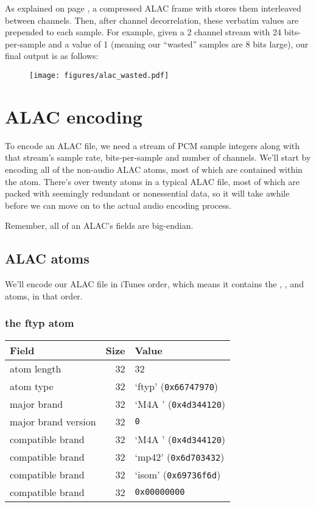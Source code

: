 As explained on page \pageref{alac_wasted_bits}, a compressed ALAC frame
with  stores them interleaved between channels.
Then, after channel decorrelation, these verbatim values are
prepended to each sample.
For example, given a 2 channel stream with 24 bits-per-sample and
a  value of 1 (meaning our ``wasted'' samples
are 8 bits large), our final output is as follows:
\begin{figure}[h]
\texttt{[image: figures/alac\_wasted.pdf]}
\end{figure}

\clearpage

\section{ALAC encoding}

To encode an ALAC file, we need a stream of PCM sample integers
along with that stream's sample rate, bits-per-sample and number of
channels.
We'll start by encoding all of the non-audio ALAC atoms,
most of which are contained within the  atom.
There's over twenty atoms in a typical ALAC file,
most of which are packed with seemingly redundant or
nonessential data,
so it will take awhile before we can move on to the actual
audio encoding process.

Remember, all of an ALAC's fields are big-endian.

\subsection{ALAC atoms}

We'll encode our ALAC file in iTunes order, which means
it contains the , ,  and
 atoms, in that order.

\subsubsection{the ftyp atom}

\begin{table}[h]
\begin{tabular}{|l|r|l|}
\hline
Field & Size & Value \\
\hline
atom length & 32 & 32 \\
atom type & 32 & `ftyp' (\texttt{0x66747970}) \\
\hline
major brand & 32 & `M4A ' (\texttt{0x4d344120}) \\
major brand version & 32 & \texttt{0} \\
compatible brand & 32 & `M4A ' (\texttt{0x4d344120}) \\
compatible brand & 32 & `mp42' (\texttt{0x6d703432}) \\
compatible brand & 32 & `isom' (\texttt{0x69736f6d}) \\
compatible brand & 32 & \texttt{0x00000000} \\
\hline
\end{tabular}
\end{table}


